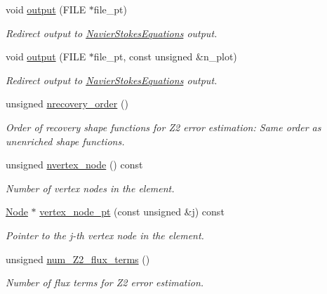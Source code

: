 \begin{DoxyCompactItemize}
void \hyperlink{classoomph_1_1GeneralisedNewtonianTCrouzeixRaviartElement_a3147cc62be2891996cf4e11fe8e5be79}{output} (F\+I\+LE $\ast$file\+\_\+pt)
\begin{DoxyCompactList}\small\item\em Redirect output to \hyperlink{classoomph_1_1NavierStokesEquations}{Navier\+Stokes\+Equations} output. \end{DoxyCompactList}\item 
void \hyperlink{classoomph_1_1GeneralisedNewtonianTCrouzeixRaviartElement_a5cd44245b4ad4ecbf6179be6068d37ea}{output} (F\+I\+LE $\ast$file\+\_\+pt, const unsigned \&n\+\_\+plot)
\begin{DoxyCompactList}\small\item\em Redirect output to \hyperlink{classoomph_1_1NavierStokesEquations}{Navier\+Stokes\+Equations} output. \end{DoxyCompactList}\item 
unsigned \hyperlink{classoomph_1_1GeneralisedNewtonianTCrouzeixRaviartElement_aea98b68015a21595aafda3f4a2ef6cba}{nrecovery\+\_\+order} ()
\begin{DoxyCompactList}\small\item\em Order of recovery shape functions for Z2 error estimation\+: Same order as unenriched shape functions. \end{DoxyCompactList}\item 
unsigned \hyperlink{classoomph_1_1GeneralisedNewtonianTCrouzeixRaviartElement_a6eabb8253427c2b4b5ed8f466b009ffc}{nvertex\+\_\+node} () const
\begin{DoxyCompactList}\small\item\em Number of vertex nodes in the element. \end{DoxyCompactList}\item 
\hyperlink{classoomph_1_1Node}{Node} $\ast$ \hyperlink{classoomph_1_1GeneralisedNewtonianTCrouzeixRaviartElement_a5f782473353e5e90ca5bc0edf0f82610}{vertex\+\_\+node\+\_\+pt} (const unsigned \&j) const
\begin{DoxyCompactList}\small\item\em Pointer to the j-\/th vertex node in the element. \end{DoxyCompactList}\item 
unsigned \hyperlink{classoomph_1_1GeneralisedNewtonianTCrouzeixRaviartElement_a436beb40886487adb54a70d4ce24ac2f}{num\+\_\+\+Z2\+\_\+flux\+\_\+terms} ()
\begin{DoxyCompactList}\small\item\em Number of \textquotesingle{}flux\textquotesingle{} terms for Z2 error estimation. \end{DoxyCompactList}\item 

\end{DoxyCompactItemize}
